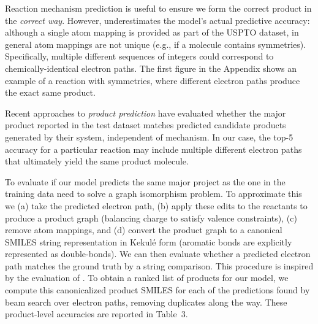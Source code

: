Reaction mechanism prediction is useful to ensure we form the correct product in the {\em correct way}.
However, underestimates the model's actual predictive accuracy: although a single atom mapping is provided as part of the USPTO dataset, in general atom mappings are not unique (e.g., if a molecule contains symmetries). Specifically, multiple different sequences of integers could correspond to chemically-identical electron paths. 
The first figure in the Appendix shows an example of a reaction with symmetries, where different electron paths produce the exact same product. 

Recent approaches to {\em product prediction} \citep{jin2017predicting,schwaller2017found}
have evaluated whether the major product reported in the test dataset matches predicted candidate products generated by their system, independent of mechanism.
In our case, the top-5 accuracy for a particular reaction may include multiple different electron paths that ultimately yield the same product molecule.

To evaluate if our model predicts the same major project as the one in the training data need to solve a graph isomorphism problem. To approximate this 
we (a) take the predicted electron path, 
(b) apply these edits to the reactants to produce a product graph (balancing charge to satisfy valence constraints), 
(c) remove atom mappings,
and (d) convert the product graph to a canonical SMILES string representation in Kekul\'e form (aromatic bonds are explicitly represented as double-bonds). 
We can then evaluate whether a predicted electron path matches the ground truth by a string comparison. This procedure is inspired by the evaluation of \citet{schwaller2017found}. To obtain a ranked list of products for our model, we compute this canonicalized product SMILES for each of the predictions found by beam search over electron paths, removing duplicates along the way. 
These product-level accuracies are reported in Table~3.

